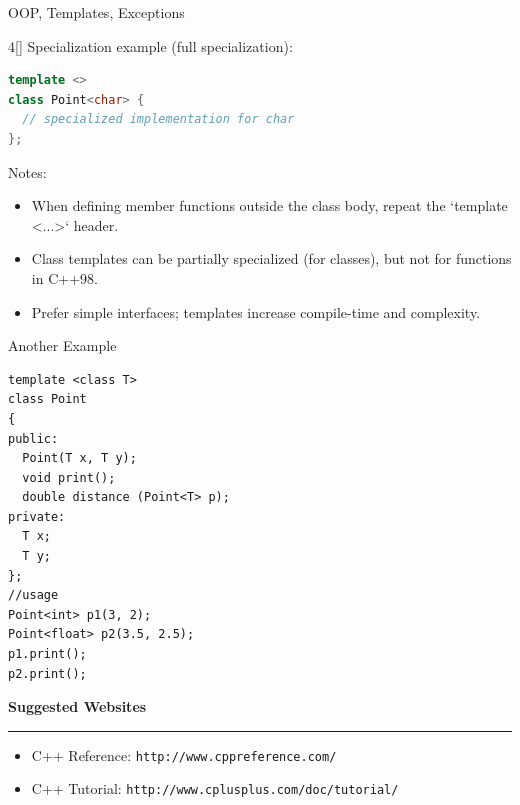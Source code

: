 \documentclass[final]{beamer}
\renewcommand{\subsection}[1]{%
  \par\vspace{1em}%
  {\noindent\large\bfseries #1\par}%
  \vspace{0.5em}\hrule\vspace{1em}%
}
\begin{document}
\begin{frame}[t,fragile]{OOP, Templates, Exceptions}
\begin{multicols}{4}[\setlength{\columnsep}{1.5cm}]
Specialization example (full specialization):
\begin{lstlisting}[language=C++]
template <>
class Point<char> {
  // specialized implementation for char
};
\end{lstlisting}

Notes:
\begin{itemize}
 \item When defining member functions outside the class body, repeat the `template <...>` header.
\item Class templates can be partially specialized (for classes), but not for functions in C++98.
\item  Prefer simple interfaces; templates increase compile-time and complexity.
\end{itemize}

Another Example
\begin{lstlisting}
template <class T>
class Point
{
public:
  Point(T x, T y);
  void print();
  double distance (Point<T> p);
private:
  T x;
  T y;
};
//usage
Point<int> p1(3, 2);
Point<float> p2(3.5, 2.5); 
p1.print();
p2.print();
\end{lstlisting}

 \subsection{Suggested Websites}
\begin{itemize}
    \item C++ Reference: \texttt{http://www.cppreference.com/}
    \item C++ Tutorial: \texttt{http://www.cplusplus.com/doc/tutorial/}
\end{itemize}


\end{multicols}
\end{frame}
\end{document}
